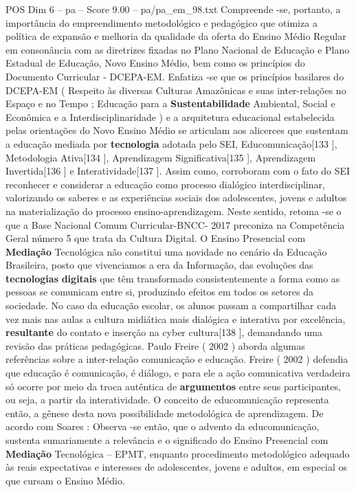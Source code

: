 \begin{textsample}{POS Dim 6 – pa – Score 9.00 – pa/pa\_em\_98.txt}
Compreende -se, portanto, a importância do empreendimento metodológico e pedagógico que otimiza a política de expansão e melhoria da qualidade da oferta do Ensino Médio Regular em consonância com as diretrizes fixadas no Plano Nacional de Educação e Plano Estadual de Educação, Novo Ensino Médio, bem como os princípios do Documento Curricular - DCEPA-EM.
Enfatiza -se que os princípios basilares do DCEPA-EM ( Respeito às diversas Culturas Amazônicas e suas inter-relações no Espaço e no Tempo ; Educação para a \textbf{Sustentabilidade} Ambiental, Social e Econômica e a Interdisciplinaridade ) e a arquitetura educacional estabelecida pelas orientações do Novo Ensino Médio se articulam aos alicerces que sustentam a educação mediada por \textbf{tecnologia} adotada pelo SEI, Educomunicação[133 ], Metodologia Ativa[134 ], Aprendizagem Significativa[135 ], Aprendizagem Invertida[136 ] e Interatividade[137 ].
Assim como, corroboram com o fato do SEI reconhecer e considerar a educação como processo dialógico interdisciplinar, valorizando os saberes e as experiências sociais dos adolescentes, jovens e adultos na materialização do processo ensino-aprendizagem.
Neste sentido, retoma -se o que a Base Nacional Comum Curricular-BNCC- 2017 preconiza na Competência Geral número 5 que trata da Cultura Digital.
O Ensino Presencial com \textbf{Mediação} Tecnológica não constitui uma novidade no cenário da Educação Brasileira, posto que vivenciamos a era da Informação, das evoluções das \textbf{tecnologias} \textbf{digitais} que têm transformado consistentemente a forma como as pessoas se comunicam entre si, produzindo efeitos em todos os setores da sociedade.
No caso da educação escolar, os alunos passam a compartilhar cada vez mais nas aulas a cultura midiática mais dialógica e interativa por excelência, \textbf{resultante} do contato e inserção na cyber cultura[138 ], demandando uma revisão das práticas pedagógicas.
Paulo Freire ( 2002 ) aborda algumas referências sobre a inter-relação comunicação e educação.
Freire ( 2002 ) defendia que educação é comunicação, é diálogo, e para ele a ação comunicativa verdadeira só ocorre por meio da troca autêntica de \textbf{argumentos} entre seus participantes, ou seja, a partir da interatividade.
O conceito de educomunicação representa então, a gênese desta nova possibilidade metodológica de aprendizagem.
De acordo com Soares : Observa -se então, que o advento da educomunicação, sustenta sumariamente a relevância e o significado do Ensino Presencial com \textbf{Mediação} Tecnológica – EPMT, enquanto procedimento metodológico adequado às reais expectativas e interesses de adolescentes, jovens e adultos, em especial os que cursam o Ensino Médio.

\end{textsample}
